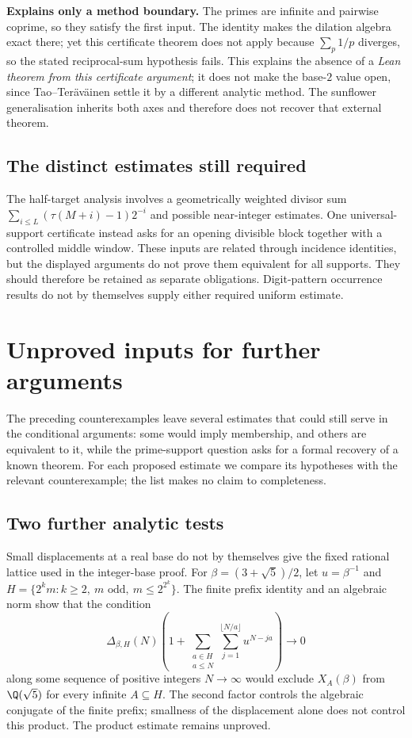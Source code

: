 \textbf{Explains only a method boundary.} The primes are infinite and pairwise coprime, so they satisfy the
first input.  The identity
 makes
the dilation algebra exact there; yet this certificate theorem does not
apply because $\sum_p1/p$ diverges, so the stated reciprocal-sum
hypothesis fails.  This explains
the absence of a \emph{Lean theorem from this certificate argument}; it does not make the
base-$2$ value open, since Tao--Ter\"av\"ainen settle it by a different
analytic method.  The sunflower generalisation inherits both axes and
therefore does not recover that external theorem.

\subsection{The distinct estimates still required}

The half-target analysis involves a geometrically weighted divisor sum
$\sum_{i\le L}(\tau(M+i)-1)2^{-i}$ and possible near-integer estimates.
One universal-support certificate instead asks for an opening divisible
block together with a controlled middle window.  These inputs are related
through incidence identities, but the displayed arguments do not prove
them equivalent for all supports.  They should therefore be retained as
separate obligations.  Digit-pattern occurrence results do not by
themselves supply either required uniform estimate.

\section{Unproved inputs for further arguments}
\label{sec:257-survivors}
The preceding counterexamples leave several estimates that could still
serve in the conditional arguments: some would imply membership, and
others are equivalent to it, while the prime-support question asks for
a formal recovery of a known theorem. For each proposed estimate we
compare its hypotheses with the relevant counterexample; the list makes
no claim to completeness.

\subsection*{Two further analytic tests}
Small displacements at a real base do not by themselves give the fixed
rational lattice used in the integer-base proof.  For
$\beta=(3+\sqrt5)/2$, let $u=\beta^{-1}$ and
$H=\{2^km:k\ge2,\ m\text{ odd},\ m\le2^{2^k}\}$.
The finite prefix identity and an algebraic norm show that the condition
\[
 \Delta_{\beta,H}(N)
 \left(1+\sum_{\substack{a\in H\\a\le N}}
                 \sum_{j=1}^{\lfloor N/a\rfloor}u^{N-ja}\right)
 \longrightarrow0
\]
along some sequence of positive integers $N\to\infty$ would exclude $X_A(\beta)$ from $\Q(\sqrt5)$ for every
infinite $A\subseteq H$.  The second factor controls the algebraic
conjugate of the finite prefix; smallness of the displacement alone does
not control this product.  The product estimate remains unproved.


